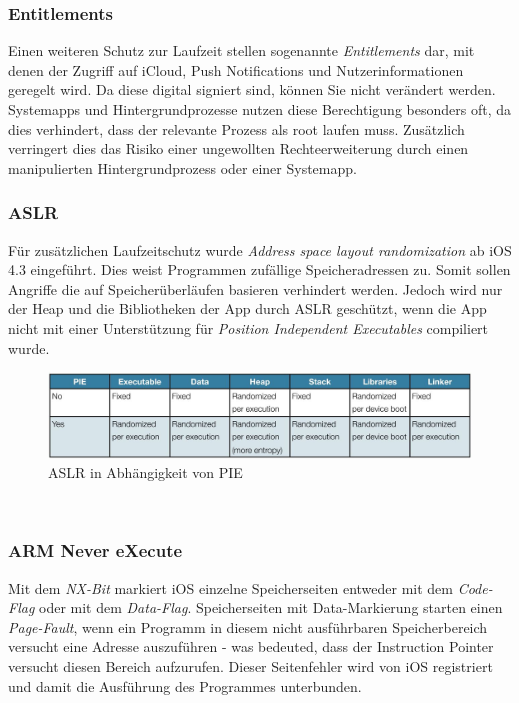 		\subsubsection{Entitlements}
			Einen weiteren Schutz zur Laufzeit stellen sogenannte \textsl{Entitlements}
			dar, mit denen der Zugriff auf iCloud, Push	Notifications und
			Nutzerinformationen geregelt wird. Da diese digital signiert sind, können Sie
			nicht verändert werden. Systemapps und Hintergrundprozesse nutzen diese
			Berechtigung besonders oft, da dies verhindert, dass der relevante Prozess als
			root laufen muss. Zusätzlich verringert dies das Risiko einer ungewollten
			Rechteerweiterung durch einen manipulierten Hintergrundprozess oder einer
			Systemapp.\\
		
		\subsubsection{ASLR}
			Für zusätzlichen Laufzeitschutz wurde \textsl{Address space layout
			randomization}\cite{iOS4SecurityEvalutaion} ab iOS 4.3 eingeführt. Dies weist
			Programmen zufällige Speicheradressen zu. Somit sollen Angriffe die auf
			Speicherüberläufen basieren verhindert werden\cite[S.131]{Levin2012}. Jedoch
			wird nur der Heap und die Bibliotheken der App durch ASLR geschützt, wenn
			die App nicht mit einer Unterstützung für \textsl{Position Independent
			Executables} compiliert wurde.
			\begin{figure}[h]
				\centering
				\includegraphics[width=0.9\linewidth]{ios/media/aslr-pie.jpg}
				\caption{ASLR in Abhängigkeit von PIE
				\cite{iOS4SecurityEvalutaion}}
				\label{fig:aslr}
			\end{figure}\\
		
		\subsubsection{ARM Never eXecute}
			Mit dem \textsl{NX-Bit} markiert iOS einzelne Speicherseiten entweder mit dem
			\textsl{Code-Flag} oder mit dem \textsl{Data-Flag}. Speicherseiten mit
			Data-Markierung starten einen \textsl{Page-Fault}, wenn ein Programm in
			diesem nicht ausführbaren Speicherbereich versucht eine Adresse auszuführen
			- was bedeuted, dass der Instruction Pointer versucht diesen Bereich
			aufzurufen. Dieser Seitenfehler wird von iOS registriert und damit die
			Ausführung des Programmes unterbunden\cite[S.310]{Levin2012}.
